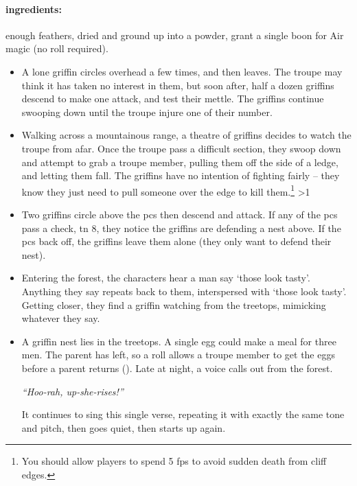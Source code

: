 \begin{multicols}{2}
\paragraph{\Glspl{ingredient}:}
enough feathers, dried and ground up into a powder, grant a single \gls{boon} for Air magic (no roll required).

\showEnc

\begin{itemize}
  \item
  A lone griffin circles overhead a few times, and then leaves.
  The troupe may think it has taken no interest in them, but soon after, half a dozen griffins descend to make one attack, and test their mettle.
  The griffins continue swooping down until the troupe injure one of their number.
  \item
  Walking across a mountainous range, a theatre of griffins decides to watch the troupe from afar.
  Once the troupe pass a difficult section, they swoop down and attempt to grab a troupe member, pulling them off the side of a ledge, and letting them fall.
  The griffins have no intention of fighting fairly -- they know they just need to pull someone over the edge to kill them.\footnote{You should allow players to spend 5 \glspl{fp} to avoid sudden death from cliff edges.}
  \ifnum\value{temperature}>1
    \item
    Two griffins circle above the \glspl{pc} then descend and attack.
    If any of the \glspl{pc} pass a  check, \gls{tn} 8, they notice the griffins are defending a nest above.
    If the \glspl{pc} back off, the griffins leave them alone (they only want to defend their nest).
  \else
    \item
    Entering the forest, the characters hear a man say `those look tasty'.
    Anything they say repeats back to them, interspersed with `those look tasty'.
    Getting closer, they find a griffin watching from the treetops, mimicking whatever they say.
  \fi
  \item
  \ifodd\value{r4}
    A griffin nest lies in the treetops.
    A single egg could make a meal for three men.
    The parent has left, so a  roll allows a troupe member to get the eggs before a parent returns (\tn[9]).
  \else
    Late at night, a voice calls out from the forest.

    \textit{``Hoo-rah, up-she-rises!''}

    It continues to sing this single verse, repeating it with exactly the same tone and pitch, then goes quiet, then starts up again.


\end{itemize}
\end{multicols}
